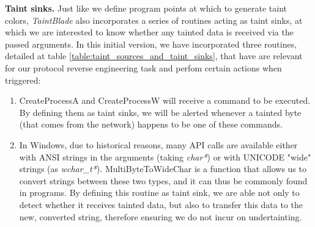 \documentclass[conference]{IEEEtran}
\begin{document}
\textbf{Taint sinks.} Just like we define program points at which to generate taint colors,
\textit{TaintBlade} also incorporates a series of routines acting as taint sinks,
at which we are interested to know whether any tainted data is received via the passed
arguments. In this initial version, we have incorporated three routines, detailed at
table \ref{table:taint_sources_and_taint_sinks}, that have are relevant for our protocol
reverse engineering task and perfom certain actions when triggered:
\begin{enumerate}
    \item CreateProcessA and CreateProcessW will receive a command to be executed. By
          defining them as taint sinks, we will be alerted whenever a tainted byte (that
          comes from the network) happens to be one of these commands.
    \item In Windows, due to historical reasons, many API calls are available either with
          ANSI strings in the arguments (taking \textit{char*}) or with UNICODE "wide"
          strings (as \textit{wchar\_t*}). MultiByteToWideChar is a function that allows
          us to convert strings between these two types, and it can thus be commonly
          found in programs. By defining this routine as taint sink, we are able not only
          to detect whether it receives tainted data, but also to transfer this data to
          the new, converted string, therefore ensuring we do not incur on undertainting.
\end{enumerate}
\end{document}
